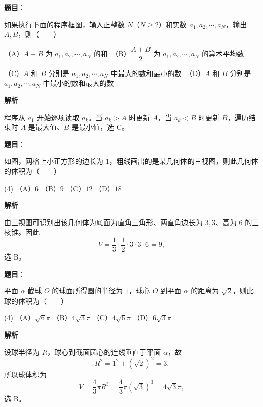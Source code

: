 \begin{answer}

\textbf{题目}：

如果执行下面的程序框图，输入正整数 $N$（$N\geqslant2$）和实数 $a_1,a_2,\cdots,a_N$，输出 $A,B$，则\mbox{（　　）}
\nopagebreak[4]
\begin{center}\end{center}
\nopagebreak[4]
（A）$A+B$ 为 $a_1,a_2,\cdots,a_N$ 的和　（B）$\dfrac{A+B}{2}$ 为 $a_1,a_2,\cdots,a_N$ 的算术平均数

（C）$A$ 和 $B$ 分别是 $a_1,a_2,\cdots,a_N$ 中最大的数和最小的数　（D）$A$ 和 $B$ 分别是 $a_1,a_2,\cdots,a_N$ 中最小的数和最大的数

\textbf{解析}

程序从 $a_1$ 开始逐项读取 $a_k$。当 $a_k>A$ 时更新 $A$，当 $a_k<B$ 时更新 $B$，遍历结束时 $A$ 是最大值、$B$ 是最小值，选 C。


\end{answer}
\begin{answer}

\textbf{题目}：

如图，网格上小正方形的边长为 $1$，粗线画出的是某几何体的三视图，则此几何体的体积为\mbox{（　　）}
\nopagebreak[4]
\begin{center}\end{center}
\nopagebreak[4]
\begin{gkopts}(4)
\task （A）$6$
\task （B）$9$
\task （C）$12$
\task （D）$18$
\end{gkopts}

\textbf{解析}

由三视图可识别出该几何体为底面为直角三角形、两直角边长为 $3,3$、高为 $6$ 的三棱锥。因此
\nopagebreak[4]
\[
V=\frac13\cdot\frac12\cdot3\cdot3\cdot6=9,
\]
选 B。


\end{answer}
\begin{answer}

\textbf{题目}：

平面 $\alpha$ 截球 $O$ 的球面所得圆的半径为 $1$，球心 $O$ 到平面 $\alpha$ 的距离为 $\sqrt2$，则此球的体积为\mbox{（　　）}

\begin{gkopts}(4)
\task （A）$\sqrt6\pi$
\task （B）$4\sqrt3\pi$
\task （C）$4\sqrt6\pi$
\task （D）$6\sqrt3\pi$
\end{gkopts}

\textbf{解析}

设球半径为 $R$，球心到截面圆心的连线垂直于平面 $\alpha$，故
\nopagebreak[4]
\[
R^2=1^2+(\sqrt2)^2=3.
\]
所以球体积为
\nopagebreak[4]
\[
V=\frac43\pi R^3=\frac43\pi(\sqrt3)^3=4\sqrt3\pi,
\]
选 B。


\end{answer}
